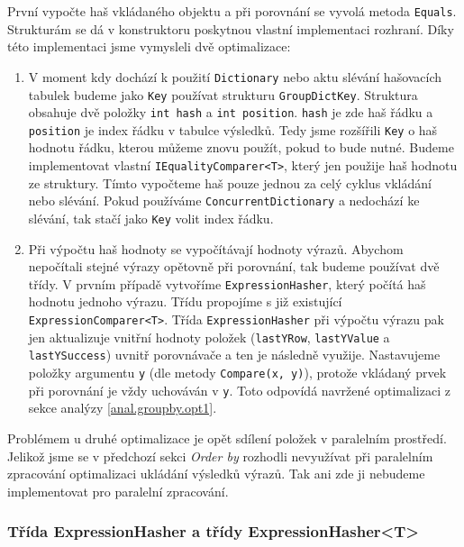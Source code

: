 První vypočte haš vkládaného objektu a při porovnání se vyvolá metoda \texttt{Equals}.
Strukturám se dá v konstruktoru poskytnou vlastní implementaci rozhraní.
Díky této implementaci jsme vymysleli dvě optimalizace:
\begin{enumerate}
\item V moment kdy dochází k použití \texttt{Dictionary} nebo aktu slévání hašovacích tabulek budeme jako \texttt{Key} používat strukturu \texttt{GroupDictKey}.
Struktura obsahuje dvě položky \texttt{int hash} a \texttt{int position}. 
\texttt{hash} je zde haš řádku a \texttt{position} je index řádku v tabulce výsledků.
Tedy jsme rozšířili \texttt{Key} o haš hodnotu řádku, kterou můžeme znovu použít, pokud to bude nutné.
Budeme implementovat vlastní \texttt{IEqualityComparer<T>}, který jen použije haš hodnotu ze struktury.
Tímto vypočteme haš pouze jednou za celý cyklus vkládání nebo slévání.
Pokud používáme \texttt{ConcurrentDictionary} a nedochází ke slévání, tak stačí jako \texttt{Key} volit index řádku.
\item Při výpočtu haš hodnoty se vypočítávají hodnoty výrazů.
Abychom nepočítali stejné výrazy opětovně při porovnání, tak budeme používat dvě třídy.
V prvním případě vytvoříme \texttt{ExpressionHasher}, který počítá haš hodnotu jednoho výrazu.
Třídu propojíme s již existující \texttt{ExpressionComparer<T>}.
Třída \texttt{ExpressionHasher} při výpočtu výrazu pak jen aktualizuje vnitřní hodnoty položek (\texttt{lastYRow}, \texttt{lastYValue} a \texttt{lastYSuccess}) uvnitř porovnávače a ten je následně využije.
Nastavujeme položky argumentu \texttt{y} (dle metody \texttt{Compare(x, y)}), protože vkládaný prvek při porovnání je vždy uchováván v \texttt{y}.
Toto odpovídá navržené optimalizaci z sekce analýzy \ref{anal.groupby.opt1}.
\end{enumerate}
Problémem u druhé optimalizace je opět sdílení položek v paralelním prostředí.
Jelikož jsme se v předchozí sekci \textit{Order by} rozhodli nevyužívat při paralelním zpracování optimalizaci ukládání výsledků výrazů.
Tak ani zde ji nebudeme implementovat pro paralelní zpracování. 

\subsubsection{Třída ExpressionHasher a třídy ExpressionHasher<T>}

